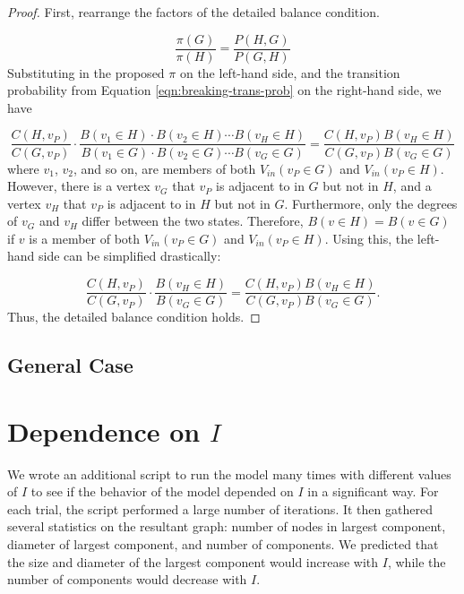 \documentclass[a4paper,10pt]{article}
\begin{document}
\begin{proof}
First, rearrange the factors of the detailed balance condition. 

\begin{equation}
 \frac{\pi(G)}{\pi(H)} = \frac{P(H, G)}{P(G, H)}
\end{equation}
Substituting in the proposed $\pi$ on the left-hand side, and the transition probability from Equation \ref{eqn:breaking-trans-prob} on the right-hand side, we have

\begin{equation}
 \frac{C(H, v_P)}{C(G, v_P)} \cdot \frac{B(v_1 \in H) \cdot B(v_2 \in H) \cdots B(v_H \in H)}
{B(v_1 \in G) \cdot B(v_2 \in G) \cdots B(v_G \in G)} = 
\frac{C(H, v_P) B(v_H \in H)}{C(G, v_P) B(v_G \in G)}
\end{equation}
where $v_1$, $v_2$, and so on, are members of both $V_{in}(v_P \in G)$ and $V_{in}(v_P \in H)$. However, there is a vertex $v_G$ that $v_P$ is adjacent to in $G$ but not in $H$, and a vertex $v_H$ that $v_P$ is adjacent to in $H$ but not in $G$. Furthermore, only the degrees of $v_G$ and $v_H$ differ between the two states. Therefore, $B(v \in H) = B(v \in G)$ if $v$ is a member of both $V_{in}(v_P \in G)$ and $V_{in}(v_P \in H)$. Using this, the left-hand side can be simplified drastically:

\begin{equation}
  \frac{C(H, v_P)}{C(G, v_P)} \cdot \frac{B(v_H \in H)}{B(v_G \in G)} = 
\frac{C(H, v_P) B(v_H \in H)}{C(G, v_P) B(v_G \in G)}.
\end{equation}
Thus, the detailed balance condition holds.


\end{proof}

\subsection{General Case}

\section{Dependence on $I$}

We wrote an additional script to run the model many times with different values of $I$ to see if the behavior of the model depended on $I$ in a significant way. For each trial, the script performed a large number of iterations. It then gathered several statistics on the resultant graph: number of nodes in largest component, diameter of largest component, and number of components. We predicted that the size and diameter of the largest component would increase with $I$, while the number of components would decrease with $I$. 
\end{document}
